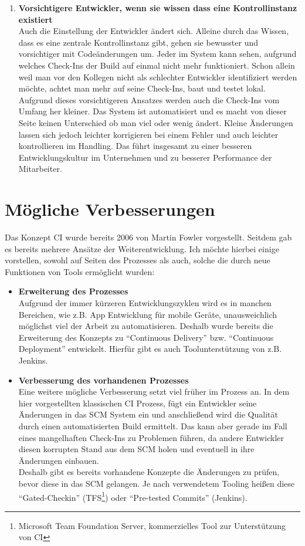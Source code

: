 \begin{enumerate}
	\item \textbf{Vorsichtigere Entwickler, wenn sie wissen dass eine Kontrollinstanz existiert}\\
	Auch die Einstellung der Entwickler ändert sich. Alleine durch das Wissen, dass es eine zentrale Kontrollinstanz gibt, gehen sie bewusster und vorsichtiger mit Codeänderungen um. Jeder im System kann sehen, aufgrund welches Check-Ins der Build auf einmal nicht mehr funktioniert. Schon allein weil man vor den Kollegen nicht als schlechter Entwickler identifiziert werden möchte, achtet man mehr auf seine Check-Ins, baut und testet lokal. Aufgrund dieses vorsichtigeren Ansatzes werden auch die Check-Ins vom Umfang her kleiner. Das System ist automatisiert und es macht von dieser Seite keinen Unterschied ob man viel oder wenig ändert. Kleine Änderungen lassen sich jedoch leichter korrigieren bei einem Fehler und auch leichter kontrollieren im Handling. Das führt insgesamt zu einer besseren Entwicklungskultur im Unternehmen und zu besserer Performance der Mitarbeiter.
\end{enumerate}
	
\section{Mögliche Verbesserungen}
Das Konzept CI wurde bereits 2006 von Martin Fowler vorgestellt. Seitdem gab es bereits mehrere Ansätze der Weiterentwicklung. Ich möchte hierbei einige vorstellen, sowohl auf Seiten des Prozesses als auch, solche die durch neue Funktionen von Tools ermöglicht wurden:
\begin{itemize}
	\item \textbf{Erweiterung des Prozesses}\\
 Aufgrund der immer kürzeren Entwicklungszyklen wird es in manchen Bereichen, wie z.B. App Entwicklung für mobile Geräte, unausweichlich möglichst viel der Arbeit zu automatisieren. Deshalb wurde bereits die Erweiterung des Konzepts zu "`Continuous Delivery"' bzw. "`Continuous Deployment"' entwickelt. Hierfür gibt es auch Toolunterstützung von z.B. Jenkins.
	\item \textbf{Verbesserung des vorhandenen Prozesses}\\
Eine weitere mögliche Verbesserung setzt viel früher im Prozess an. In dem hier vorgestellten klassischen CI Prozess, fügt ein Entwickler seine Änderungen in das SCM System ein und anschließend wird die Qualität durch einen automatisierten Build ermittelt. Das kann aber gerade im Fall eines mangelhaften Check-Ins zu Problemen führen, da andere Entwickler diesen korrupten Stand aus dem SCM holen und eventuell in ihre Änderungen einbauen.\\
Deshalb gibt es bereits vorhandene Konzepte die Änderungen zu prüfen, bevor diese in das SCM gelangen. Je nach verwendetem Tooling heißen diese "`Gated-Checkin"' (TFS\footnote{Microsoft Team Foundation Server, kommerzielles Tool zur Unterstützung von CI}) oder "`Pre-tested Commits"' (Jenkins).

\end{itemize} 